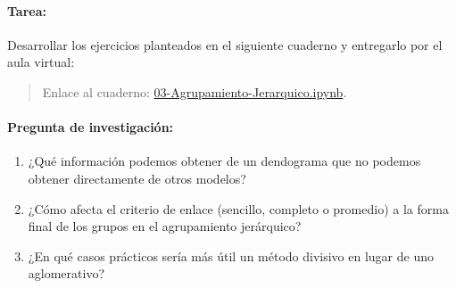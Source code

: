\documentclass[a4,11pt]{aleph-notas}
\begin{document}
\paragraph{Tarea:}  
    Desarrollar los ejercicios planteados en el siguiente cuaderno y entregarlo por el aula virtual:
    \begin{quote}
        Enlace al cuaderno: \href{https://colab.research.google.com/github/andres-merino/AprendizajeAutomaticoInicial-05-N0105/blob/main/2-Ejercicios/03-Agrupamiento-Jerarquico.ipynb}{03-Agrupamiento-Jerarquico.ipynb}.
    \end{quote}

\paragraph{Pregunta de investigación:}  
\begin{enumerate}[leftmargin=*]
    \item ¿Qué información podemos obtener de un dendograma que no podemos obtener directamente de otros modelos?
    \item ¿Cómo afecta el criterio de enlace (sencillo, completo o promedio) a la forma final de los grupos en el agrupamiento jerárquico?
    \item ¿En qué casos prácticos sería más útil un método divisivo en lugar de uno aglomerativo?
\end{enumerate}
    
\end{document}
